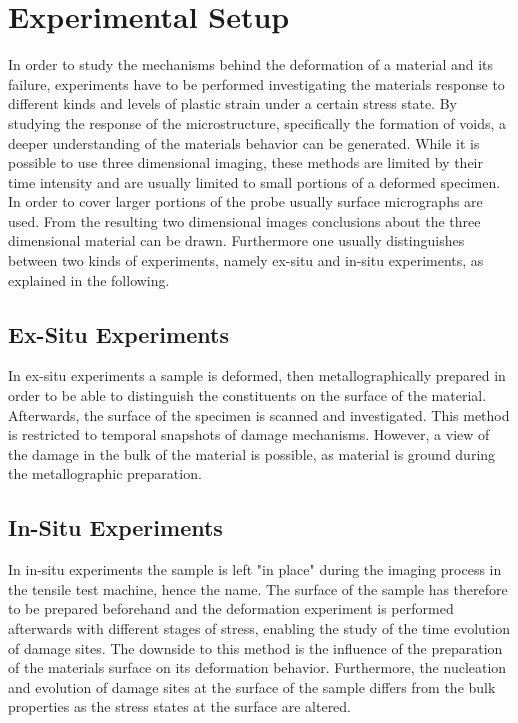 \section{Experimental Setup}
\label{sec:Ex_In_Situ}

In order to study the mechanisms behind the deformation of a material and its failure, experiments have to be performed investigating the materials response to different kinds and levels of plastic strain under a certain stress state. By studying the response of the microstructure, specifically the formation of voids, a deeper understanding of the materials behavior can be generated. While it is possible to use three dimensional imaging, these methods are limited by their time intensity and are usually limited to small portions of a deformed specimen. In order to cover larger portions of the probe usually surface micrographs are used. From the resulting two dimensional images conclusions about the three dimensional material can be drawn. Furthermore one usually distinguishes between two kinds of experiments, namely ex-situ and in-situ experiments, as explained in the following. \\
 
\subsection{Ex-Situ Experiments}

In ex-situ experiments a sample is deformed, then metallographically prepared in order to be able to distinguish the constituents on the surface of the material. Afterwards, the surface of the specimen is scanned and investigated. This method is restricted to temporal snapshots of damage mechanisms. However, a view of the damage in the bulk of the material is possible, as material is ground during the metallographic preparation. %

\subsection{In-Situ Experiments}
\label{sec:InSituExperiments}

In in-situ experiments the sample is left "in place" during the imaging process in the tensile test machine, hence the name. The surface of the sample has therefore to be prepared beforehand and the deformation experiment is performed afterwards with different stages of stress, enabling the study of the time evolution of damage sites. The downside to this method is the influence of the preparation of the materials surface on its deformation behavior. Furthermore, the nucleation and evolution of damage sites at the surface of the sample differs from the bulk properties as the stress states at the surface are altered. \\ %


